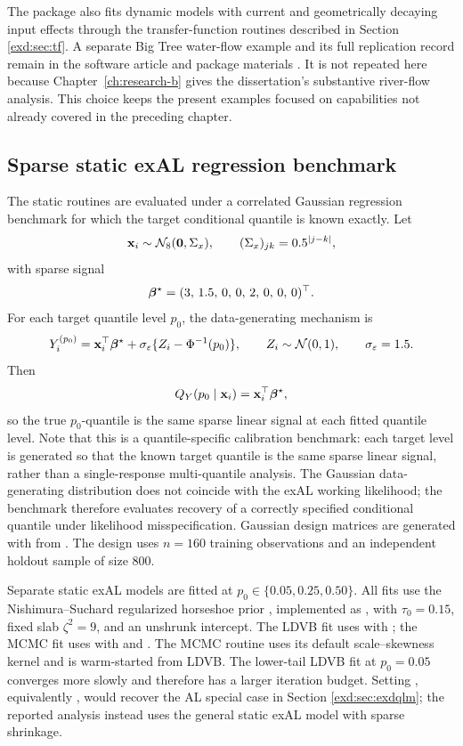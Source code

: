 The package also fits dynamic models with current and geometrically decaying
input effects through the transfer-function routines described in Section
\ref{exd:sec:tf}. A separate Big Tree water-flow example and its full
replication record remain in the software article and package materials
\citep{env-deleon2026exdqlm}. It is not repeated here because
Chapter~\ref{ch:research-b} gives the dissertation's substantive river-flow
analysis. This choice keeps the present examples focused on capabilities not
already covered in the preceding chapter.

\subsection{Sparse static exAL regression benchmark}
\label{exd:sec:ex4static}


The static routines are evaluated under a correlated Gaussian regression
benchmark for which the target conditional quantile is known exactly. Let
\[
\mathbf{x}_i \sim \mathcal{N}_8(\mathbf{0}, \Sigma_x),\qquad (\Sigma_x)_{jk} = 0.5^{|j-k|},
\]
with sparse signal
\[
\boldsymbol{\beta}^\star = (3,\,1.5,\,0,\,0,\,2,\,0,\,0,\,0)^\top.
\]
For each target quantile level \(p_0\), the data-generating mechanism is
\[
Y_i^{(p_0)} = \mathbf{x}_i^\top \boldsymbol{\beta}^\star + \sigma_\varepsilon \{Z_i - \Phi^{-1}(p_0)\},
\qquad Z_i \sim \mathcal{N}(0,1),\qquad \sigma_\varepsilon = 1.5.
\]
Then
\[
Q_Y(p_0 \mid \mathbf{x}_i) = \mathbf{x}_i^\top \boldsymbol{\beta}^\star,
\]
so the true \(p_0\)-quantile is the same sparse linear signal at each fitted quantile level. Note that this is a quantile-specific calibration benchmark: each target level is generated so that the known target quantile is the same sparse linear signal, rather than a single-response multi-quantile analysis. The Gaussian data-generating distribution does not coincide with the exAL working likelihood; the benchmark therefore evaluates recovery of a correctly specified conditional quantile under likelihood misspecification. Gaussian design matrices are generated with  from  \citep{exd-MASS}.
The design uses \(n = 160\) training observations and an independent holdout
sample of size \(800\).



Separate static exAL models are fitted at
\(p_0 \in \{0.05,0.25,0.50\}\). All fits use the Nishimura--Suchard
regularized horseshoe prior \citep{exd-nishimura2023shrunken}, implemented as
, with \(\tau_0 = 0.15\), fixed slab
\(\zeta^2 = 9\), and an unshrunk intercept. The LDVB fit uses
 with ; the MCMC fit uses
 with  and
. The MCMC routine uses its default
 scale--skewness kernel and is warm-started from LDVB.
The lower-tail LDVB fit at \(p_0 = 0.05\) converges more slowly and therefore
has a larger iteration budget. Setting , equivalently
, would recover the AL special case in Section
\ref{exd:sec:exdqlm}; the reported analysis instead uses the general static
exAL model with sparse  shrinkage.



